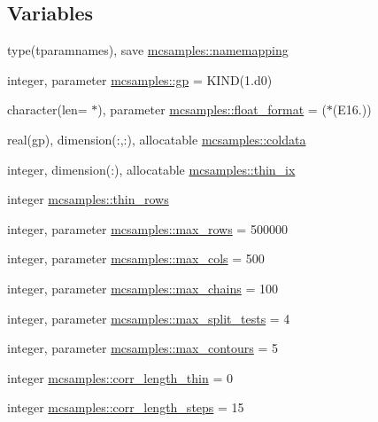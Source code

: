 \subsection*{Variables}
\begin{DoxyCompactItemize}
\item 
type(tparamnames), save \mbox{\hyperlink{namespacemcsamples_ab0b5f836670f80c8acfa3374709ddc9b}{mcsamples\+::namemapping}}
\item 
integer, parameter \mbox{\hyperlink{namespacemcsamples_a423ddd0f2de0560617b74a17231275e0}{mcsamples\+::gp}} = K\+I\+ND(1.d0)
\item 
character(len= $\ast$), parameter \mbox{\hyperlink{namespacemcsamples_a1d5c81cfc6a6d2a9f25c250cf8359142}{mcsamples\+::float\+\_\+format}} = \textquotesingle{}($\ast$(E16.))\textquotesingle{}
\item 
real(gp), dimension(\+:,\+:), allocatable \mbox{\hyperlink{namespacemcsamples_a1f7790a8989ae24a32dcef594163cfd6}{mcsamples\+::coldata}}
\item 
integer, dimension(\+:), allocatable \mbox{\hyperlink{namespacemcsamples_a68af0f07bf91f81304b0a3c46c669ffc}{mcsamples\+::thin\+\_\+ix}}
\item 
integer \mbox{\hyperlink{namespacemcsamples_a868898642c4ad498fccad75315810550}{mcsamples\+::thin\+\_\+rows}}
\item 
integer, parameter \mbox{\hyperlink{namespacemcsamples_a11a673041be4c2131b8dc7a2806e6a04}{mcsamples\+::max\+\_\+rows}} = 500000
\item 
integer, parameter \mbox{\hyperlink{namespacemcsamples_ae8386bad918d8af8d203683c01d5818c}{mcsamples\+::max\+\_\+cols}} = 500
\item 
integer, parameter \mbox{\hyperlink{namespacemcsamples_a204c829ca43df2c6d41335156e6786ee}{mcsamples\+::max\+\_\+chains}} = 100
\item 
integer, parameter \mbox{\hyperlink{namespacemcsamples_aecb93fc58e3823802a4eabc86659a889}{mcsamples\+::max\+\_\+split\+\_\+tests}} = 4
\item 
integer, parameter \mbox{\hyperlink{namespacemcsamples_a878ea2f4d47feda9ed7a1701aabfb0d1}{mcsamples\+::max\+\_\+contours}} = 5
\item 
integer \mbox{\hyperlink{namespacemcsamples_af8a6d674d091942c7820c37ad6795f6b}{mcsamples\+::corr\+\_\+length\+\_\+thin}} = 0
\item 
integer \mbox{\hyperlink{namespacemcsamples_a7cabc6db7f9125c0af7b6de3032567f1}{mcsamples\+::corr\+\_\+length\+\_\+steps}} = 15
\item 

\end{DoxyCompactItemize}
